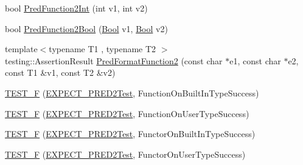 \begin{DoxyCompactItemize}
\item 
bool \mbox{\hyperlink{_obj__test_2lib_2googletest-release-1_88_81_2googletest_2test_2gtest__pred__impl__unittest_8cc_a7a3b834b08a5176afbd4bfc97d06bedd}{Pred\+Function2\+Int}} (int v1, int v2)
\item 
bool \mbox{\hyperlink{_obj__test_2lib_2googletest-release-1_88_81_2googletest_2test_2gtest__pred__impl__unittest_8cc_ab00487cdc08174c122cfaccc6abf221d}{Pred\+Function2\+Bool}} (\mbox{\hyperlink{struct_bool}{Bool}} v1, \mbox{\hyperlink{struct_bool}{Bool}} v2)
\item 
{\footnotesize template$<$typename T1 , typename T2 $>$ }\\testing\+::\+Assertion\+Result \mbox{\hyperlink{_obj__test_2lib_2googletest-release-1_88_81_2googletest_2test_2gtest__pred__impl__unittest_8cc_ac47f2d44062a47c907d113375ec47d47}{Pred\+Format\+Function2}} (const char $\ast$e1, const char $\ast$e2, const T1 \&v1, const T2 \&v2)
\item 
\mbox{\hyperlink{_obj__test_2lib_2googletest-release-1_88_81_2googletest_2test_2gtest__pred__impl__unittest_8cc_aba0b6cfb33acecfb0ab3092f2194f958}{T\+E\+S\+T\+\_\+F}} (\mbox{\hyperlink{googletest-master_2googletest_2test_2gtest__pred__impl__unittest_8cc_a232826190f0ba7ce5dffa1ced1219acc}{E\+X\+P\+E\+C\+T\+\_\+\+P\+R\+E\+D2\+Test}}, Function\+On\+Built\+In\+Type\+Success)
\item 
\mbox{\hyperlink{_obj__test_2lib_2googletest-release-1_88_81_2googletest_2test_2gtest__pred__impl__unittest_8cc_a6c5a246f545dedba3863fc60fdcec435}{T\+E\+S\+T\+\_\+F}} (\mbox{\hyperlink{googletest-master_2googletest_2test_2gtest__pred__impl__unittest_8cc_a232826190f0ba7ce5dffa1ced1219acc}{E\+X\+P\+E\+C\+T\+\_\+\+P\+R\+E\+D2\+Test}}, Function\+On\+User\+Type\+Success)
\item 
\mbox{\hyperlink{_obj__test_2lib_2googletest-release-1_88_81_2googletest_2test_2gtest__pred__impl__unittest_8cc_a512e6b394b152d77349f5b884043710c}{T\+E\+S\+T\+\_\+F}} (\mbox{\hyperlink{googletest-master_2googletest_2test_2gtest__pred__impl__unittest_8cc_a232826190f0ba7ce5dffa1ced1219acc}{E\+X\+P\+E\+C\+T\+\_\+\+P\+R\+E\+D2\+Test}}, Functor\+On\+Built\+In\+Type\+Success)
\item 
\mbox{\hyperlink{_obj__test_2lib_2googletest-release-1_88_81_2googletest_2test_2gtest__pred__impl__unittest_8cc_a4ce1ae190c7b5477db170623d18ea48f}{T\+E\+S\+T\+\_\+F}} (\mbox{\hyperlink{googletest-master_2googletest_2test_2gtest__pred__impl__unittest_8cc_a232826190f0ba7ce5dffa1ced1219acc}{E\+X\+P\+E\+C\+T\+\_\+\+P\+R\+E\+D2\+Test}}, Functor\+On\+User\+Type\+Success)

\end{DoxyCompactItemize}
